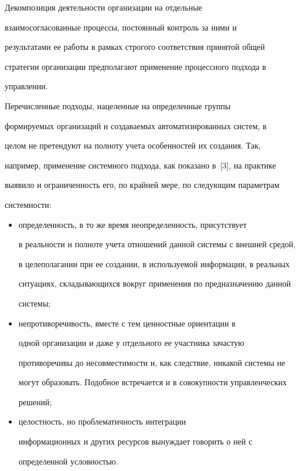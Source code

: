        


       Декомпозиция деятельности организации на отдельные 


взаимосогласованные процессы, постоянный контроль за ними и 


результатами ее работы в рамках строгого соответствия принятой общей 


стратегии организации предполагают применение процессного подхода в 


управлении. 


       


       Перечисленные подходы, нацеленные на определенные группы 


формируемых организаций и создаваемых автоматизированных систем,  в 


целом не претендуют на полноту учета особенностей их создания. Так, 


например, применение системного подхода, как показано в~[3], на практике 


выявило и ограниченность его, по крайней мере, по следующим параметрам 


системности:


       \begin{itemize}


       \item определенность, в то же время неопределенность, присутствует 


в реальности и полноте учета отношений данной системы с внешней средой, 


в целеполагании при ее создании, в используемой информации, в реальных 


ситуациях, складывающихся вокруг применения по предназначению данной 


системы;


       \item непротиворечивость, вместе с тем ценностные ориентации в 


одной организации и даже у отдельного ее участника зачастую 


противоречивы до несовместимости и, как следствие,  никакой системы не 


могут образовать. Подобное встречается и в совокупности управленческих 


решений;  


       \item целостность, но проблематичность интеграции 


информационных и других ресурсов вынуждает говорить о ней с 


определенной условностью.


       \end{itemize}


